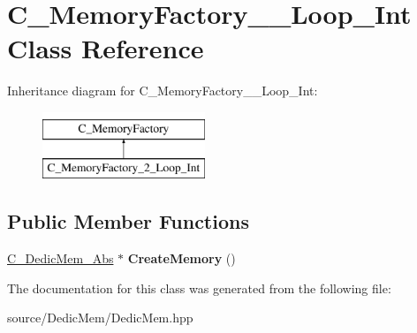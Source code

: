 \hypertarget{class_c___memory_factory__2___loop___int}{\section{C\-\_\-\-Memory\-Factory\-\_\-\_\-\-Loop\-\_\-\-Int Class Reference}
\label{class_c___memory_factory__2___loop___int}
}
Inheritance diagram for C\-\_\-\-Memory\-Factory\-\_\-\_\-\-Loop\-\_\-\-Int\-:\begin{figure}[H]
\begin{center}
\leavevmode
\includegraphics[height=2.000000cm]{class_c___memory_factory__2___loop___int}
\end{center}
\end{figure}
\subsection*{Public Member Functions}
\begin{DoxyCompactItemize}
\item 
\hypertarget{class_c___memory_factory__2___loop___int_af00c00d49226b330e89cce56fc3eddc1}{\hyperlink{class_c___dedic_mem___abs}{C\-\_\-\-Dedic\-Mem\-\_\-\-Abs} $\ast$ {\bfseries Create\-Memory} ()}\label{class_c___memory_factory__2___loop___int_af00c00d49226b330e89cce56fc3eddc1}

\end{DoxyCompactItemize}


The documentation for this class was generated from the following file\-:\begin{DoxyCompactItemize}
\item 
source/\-Dedic\-Mem/Dedic\-Mem.\-hpp\end{DoxyCompactItemize}
